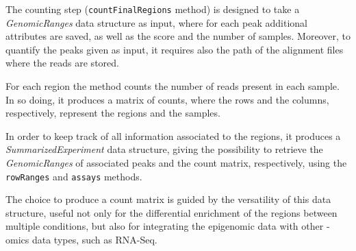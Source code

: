 The counting step (\lstinline!countFinalRegions! method) is designed to take a \textit{GenomicRanges} data structure as input, where for each peak additional attributes are saved, as well as the score and the number of samples.
Moreover, to quantify the peaks given as input, it requires also the path of the alignment files where the reads are stored.

For each region the method counts the number of reads present in each sample.
In so doing, it produces a matrix of counts, where the rows and the columns, respectively, represent the regions and the samples.

In order to keep track of all information associated to the regions, it produces a \textit{SummarizedExperiment} \cite{SummExp} data structure, giving the possibility to retrieve the \textit{GenomicRanges} of associated peaks and the count matrix, respectively, using the \lstinline!rowRanges! and \lstinline!assays! methods.

The choice to produce a count matrix is guided by the versatility of this data structure, useful not only for the differential enrichment of the regions between multiple conditions, but also for integrating the epigenomic data with other -omics data types, such as RNA-Seq.